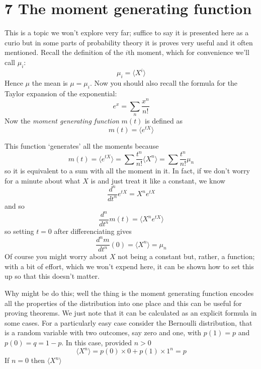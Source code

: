 \documentclass[11pt,a4paper]{scrartcl}
\begin{document}
\section*{7 The moment generating function}

This is a topic we won't explore very far; suffice to say it is
presented here as a curio but in some parts of probability theory it
is proves very useful and it often mentioned. Recall the definition of the $i$th moment, which for convenience we'll call $\mu_i$:
\begin{equation}
\mu_i=\langle X^i\rangle
\end{equation}
Hence $\mu$ the mean is $\mu=\mu_i$. Now you should also recall the
formula for the Taylor expansion of the exponential:
\begin{equation}
e^x=\sum_n \frac{x^n}{n!}
\end{equation}
Now the \textsl{moment generating function} $m(t)$ is defined as
\begin{equation}
m(t)=\langle e^{tX}\rangle
\end{equation}

This function \lq{}generates\rq{} all the moments because 
\begin{equation}
m(t)=\langle e^{tX}\rangle=\sum \frac{t^n}{n!}\langle X^n\rangle =\sum \frac{t^n}{n!}\mu_n
\end{equation}
so it is equivalent to a sum with all the moment in it. In fact, if we
don't worry for a minute about what $X$ is and just treat it like a
constant, we know
\begin{equation}
\frac{d^n}{dt^n}e^{tX}=X^ne^{tX}
\end{equation}
and so
\begin{equation}
\frac{d^n}{dt^n}m(t)=\langle X^ne^{tX}\rangle
\end{equation}
so setting $t=0$ after differenciating gives
\begin{equation}
\frac{d^nm}{dt^n}(0)=\langle X^n\rangle=\mu_n
\end{equation}
Of course you might worry about $X$ not being a constant but, rather,
a function; with a bit of effort, which we won't expend here, it can
be shown how to set this up so that this doesn't matter.

Why might be do this; well the thing is the moment generating function
encodes all the properties of the distribution into one place and this
can be useful for proving theorems. We just note that it can be
calculated as an explicit formula in some cases. For a particularly
easy case consider the Bernoulli distribution, that is a random
variable with two outcomes, say zero and one, with $p(1)=p$ and $p(0)=q=1-p$. In this case, provided $n>0$
\begin{equation}
\langle X^n\rangle = p(0)\times 0 + p(1)\times 1^n=p
\end{equation}
If $n=0$ then $\langle X^n\rangle$
\end{document}
